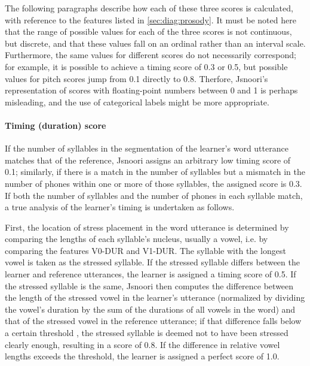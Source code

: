 	
	The following paragraphs describe how each of these three scores is calculated, with reference to the features listed in \cref{sec:diag:prosody}. It must be noted here that the range of possible values for each of the three scores is not continuous, but discrete, and that these values fall on an ordinal rather than an interval scale. Furthermore, the same values for different scores do not necessarily correspond; for example, it is possible to achieve a timing score of 0.3 or 0.5, but possible values for pitch scores jump from 0.1 directly to 0.8.
	Therfore, Jsnoori's representation of scores with floating-point numbers between 0 and 1 is perhaps misleading, and the use of categorical labels might be more appropriate.
	
	
	
	\paragraph{Timing (duration) score}
	
	If the number of syllables in the segmentation of the learner's word utterance matches that of the reference, Jsnoori assigns an arbitrary low timing score of 0.1; similarly, if there is a match in the number of syllables but a mismatch in the number of phones within one or more of those syllables, the assigned score is 0.3. 
	If both the number of syllables and the number of phones in each syllable match, a true analysis of the learner's timing is undertaken as follows.
	
	First, the location of stress placement in the word utterance is determined by comparing the lengths of each syllable's nucleus, usually a vowel, i.e. by comparing the features V0-DUR and V1-DUR. The syllable with the longest vowel is taken as the stressed syllable. If the stressed syllable differs between the learner and reference utterances, the learner is assigned a timing score of 0.5. If the stressed syllable is the same, Jsnoori then computes the difference between the length of the stressed vowel in the learner's utterance (normalized by dividing the vowel's duration by the sum of the durations of all vowels in the word) and that of the stressed vowel in the reference utterance; if that difference falls below a certain threshold , the stressed syllable is deemed not to have been stressed clearly enough, resulting in a score of 0.8. If the difference in relative vowel lengths exceeds the threshold, the learner is assigned a perfect score of 1.0.
	
